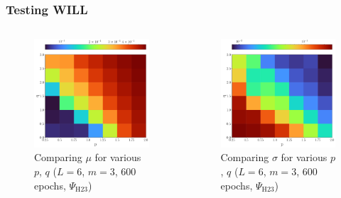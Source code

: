 \documentclass{beamer}
\begin{document}
\begin{frame}
\frametitle{Testing WILL}
\begin{columns}
\begin{column}{0.5\textwidth}
\begin{figure}
\centering 
\includegraphics[width=\textwidth]{im/mean_3_6_600}
\caption{Comparing $\mu$ for various $p$, $q$ ($L=6$, $m=3$, 600 epochs, $\Psi_\text{H23}$)}
\end{figure}
\end{column}
\begin{column}{0.5\textwidth}
\begin{figure}
\centering 
\includegraphics[width=\textwidth]{im/std_3_6_600}
\caption{Comparing $\sigma$ for various $p$, $q$ ($L=6$, $m=3$, 600 epochs, $\Psi_\text{H23}$)}
\end{figure}
\end{column}
\end{columns}
\end{frame}
\end{document}
